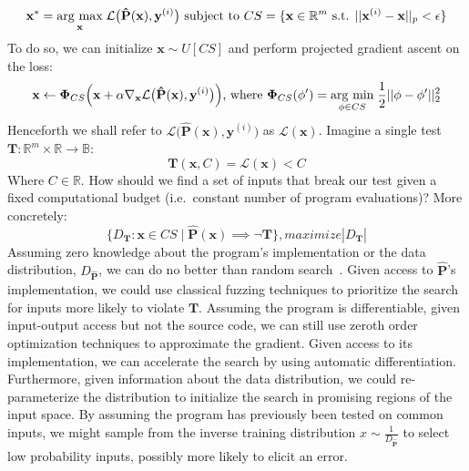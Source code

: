 %
\begin{equation}
\mathbf{x}^* = \underset{\mathbf{x}}{\operatorname{arg}\,\operatorname{max}}\;\mathcal{L}\big(\mathbf{\hat P}(\mathbf{x}), \mathbf{y}^{(i)}\big) \text{ subject to } CS = \{\mathbf{x} \in \mathbb{R}^m \text{ s.t. } ||\mathbf{x}^{(i)} - \mathbf{x}||_p    < \epsilon\}
\end{equation}
%
To do so, we can initialize $\mathbf{x} \sim U[CS]$ and perform projected gradient ascent on the loss:
%
\begin{equation}\label{eq:projected_gd}
\mathbf x \leftarrow \bm\Phi_{CS}\Big(\mathbf x + \alpha\mathbf\nabla_{\mathbf x} \mathcal{L}\big(\mathbf{\hat P}(\mathbf{x}), \mathbf{y}^{(i)}\big)\Big) \text{, where }
\bm\Phi_{CS}(\mathbf \phi') = \underset{\mathbf \phi \in CS}{\operatorname{arg}\,\operatorname{min}}\;\frac{1}{2}||\mathbf \phi - \mathbf \phi'||^2_2
\end{equation}
%
Henceforth we shall refer to $\mathcal{L}\big(\mathbf{\hat P}(\mathbf{x}), \mathbf{y}^{(i)}\big)$ as $\mathcal{L}(\mathbf x)$. Imagine a single test $\mathbf{T}: \mathbb{R}^m \times \mathbb{R} \rightarrow \mathbb{B}$:
%
\begin{equation} \label{eq:output_constraint_example}
\mathbf T(\mathbf{x}, C) = \mathcal{L}(\mathbf{x}) < C
\end{equation}
%
Where $C \in \mathbb{R}$. How should we find a set of inputs that break our test given a fixed computational budget (i.e.\ constant number of program evaluations)? More concretely:
%
\begin{equation}
\{ D_\mathbf T: \mathbf x \in CS \mid \mathbf{\hat P}(\mathbf x) \implies \neg \mathbf T \}, maximize |D_\mathbf T|
\end{equation}
%
Assuming zero knowledge about the program's implementation or the data distribution, $D_{\mathbf{\hat P}}$, we can do no better than random search~\citep{wolpert1997no}. Given access to $\mathbf{\hat P}$'s implementation, we could use classical fuzzing techniques to prioritize the search for inputs more likely to violate $\mathbf T$. Assuming the program is differentiable, given input-output access but not the source code, we can still use zeroth order optimization techniques to approximate the gradient. Given access to its implementation, we can accelerate the search by using automatic differentiation. Furthermore, given information about the data distribution, we could re-parameterize the distribution to initialize the search in promising regions of the input space. By assuming the program has previously been tested on common inputs, we might sample from the inverse training distribution $x \sim \frac{1}{D_{\mathbf{\hat P}}}$ to select low probability inputs, possibly more likely to elicit an error.

